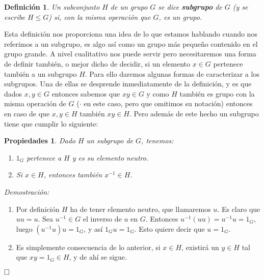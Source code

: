 \documentclass[12pt]{article}
\newtheorem{definition}[theorem]{Definición}
\newtheorem{properties}{Propiedades}[theorem]
\begin{document}
\begin{definition}Un subconjunto $H$ de un grupo $G$ se dice \textbf{subgrupo} de $G$ (y se escribe $H \leq G$) si, con la misma operación que $G$, es un grupo.
\end{definition}

Esta definición nos proporciona una idea de lo que estamos hablando cuando nos referimos a un subgrupo, es algo así como un grupo más pequeño contenido en el grupo grande. A nivel cualitativo nos puede servir pero necesitaremos una forma de definir también, o mejor dicho de decidir, si un elemento $x \in G$ pertenece también a un subgrupo $H$. Para ello daremos algunas formas de caracterizar a los subgrupos. Una de ellas se desprende inmediatamente de la definición, y es que dados $x,y \in G$ entonces sabemos que $xy \in G$ y como $H$ también es grupo con la misma operación de $G$ ($\cdot$ en este caso, pero que omitimos su notación) entonces en caso de que $x,y \in H$ también $xy \in H$. Pero además de este hecho un subgrupo tiene que cumplir lo siguiente:
\begin{properties} Dado $H$ un subgrupo de $G$, tenemos: \begin{enumerate}
\item $1_{G}$ pertenece a $H$ y es su elemento neutro.
\item Si $x \in H$, entonces también $x^{-1} \in H$.
\end{enumerate}
\end{properties}
\emph{Demostración: } \begin{enumerate}

\item Por definición $H$ ha de tener elemento neutro, que llamaremos $u$. Es claro que $uu = u$. Sea $u^{-1} \in G$ el inverso de $u$ en $G$. Entonces $u^{-1}(uu) = u^{-1} u = 1_{G}$, luego $(u^{-1}u)u = 1_{G}$, y así $1_{G}u = 1_{G}$. Esto quiere decir que $u = 1_{G}.$

\item Es simplemente consecuencia de lo anterior, si $x \in H$, existirá un $y \in H$ tal que $xy = 1_{G} \in H$, y de ahí se sigue.
\end{enumerate}
$\hfill \square$
\end{document}
